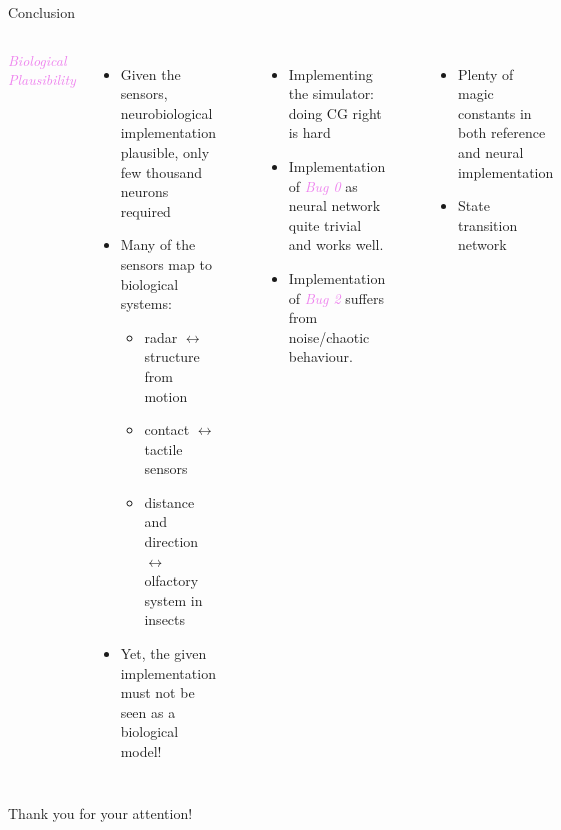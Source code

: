 \documentclass[aspectratio=169]{beamer}
\begin{document}
\begin{frame}{Conclusion}
	\begin{columns}[t]
		\emph{\textcolor{violet}{Biological Plausibility}}
		\begin{itemize}
			\item Given the sensors, neurobiological implementation plausible, only few thousand neurons required
			\item Many of the sensors map to biological systems:
			\begin{itemize}
				\item radar $\leftrightarrow$ structure from motion
				\item contact $\leftrightarrow$ tactile sensors
				\item distance and direction $\leftrightarrow$ olfactory system in insects
			\end{itemize}\vspace{0.225cm}
			\item[\symbolfont{⚠}] Yet, the given implementation must not be seen as a biological model!
		\end{itemize}
		~
		\begin{itemize}
			\item<2-> Implementing the simulator:\\doing CG right is hard\textellipsis
			\item<2-> Implementation of \textcolor{violet}{\emph{Bug 0}} as neural network quite trivial and works well.
			\item<2-> Implementation of \textcolor{violet}{\emph{Bug 2}} suffers from noise/chaotic behaviour.
		\end{itemize}
		\vspace{0.3cm}
		~
		\begin{itemize}
			\item<3-> Plenty of magic constants in both reference and neural implementation
			\item<3-> State transition network
		\end{itemize}
	\end{columns}
\end{frame}

\begin{frame}
	\centering
	\huge
	Thank you for your attention!
\end{frame}
\end{document}
